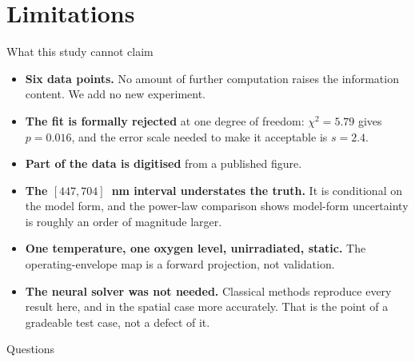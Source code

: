 \documentclass[aspectratio=169,10pt]{beamer}
\begin{document}
\section{Limitations}

\begin{frame}{What this study cannot claim}
\begin{itemize}
  \item \textbf{Six data points.} No amount of further computation raises
        the information content. We add no new experiment.
  \item \textbf{The fit is formally rejected} at one degree of freedom:
        $\chi^2 = 5.79$ gives $p = 0.016$, and the error scale needed to
        make it acceptable is $s = 2.4$.
  \item \textbf{Part of the data is digitised} from a published figure.
  \item \textbf{The $[447, 704]$~nm interval understates the truth.} It is
        conditional on the model form, and the power-law comparison shows
        model-form uncertainty is roughly an order of magnitude larger.
  \item \textbf{One temperature, one oxygen level, unirradiated, static.}
        The operating-envelope map is a forward projection, not validation.
  \item \textbf{The neural solver was not needed.} Classical methods
        reproduce every result here, and in the spatial case more
        accurately. That is the point of a gradeable test case, not a
        defect of it.
\end{itemize}
\end{frame}

\begin{frame}[standout]
Questions
\end{frame}

\appendix
\end{document}

